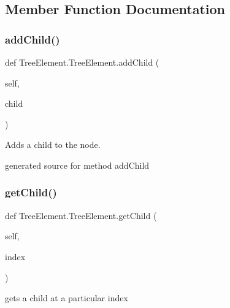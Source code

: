 \subsection{Member Function Documentation}
\hypertarget{class_tree_element_1_1_tree_element_ae5e92bcded51f4931c2f5c47d44ff26c}{}\label{class_tree_element_1_1_tree_element_ae5e92bcded51f4931c2f5c47d44ff26c} 
\subsubsection{\texorpdfstring{add\+Child()}{addChild()}}
{\footnotesize\ttfamily def Tree\+Element.\+Tree\+Element.\+add\+Child (\begin{DoxyParamCaption}\item[{}]{self,  }\item[{}]{child }\end{DoxyParamCaption})}



Adds a child to the node. 

\begin{DoxyVerb}generated source for method addChild \end{DoxyVerb}
 \hypertarget{class_tree_element_1_1_tree_element_a5e1fc58ee2948c44f827969d3a817a38}{}\label{class_tree_element_1_1_tree_element_a5e1fc58ee2948c44f827969d3a817a38} 
\subsubsection{\texorpdfstring{get\+Child()}{getChild()}}
{\footnotesize\ttfamily def Tree\+Element.\+Tree\+Element.\+get\+Child (\begin{DoxyParamCaption}\item[{}]{self,  }\item[{}]{index }\end{DoxyParamCaption})}



gets a child at a particular index 


